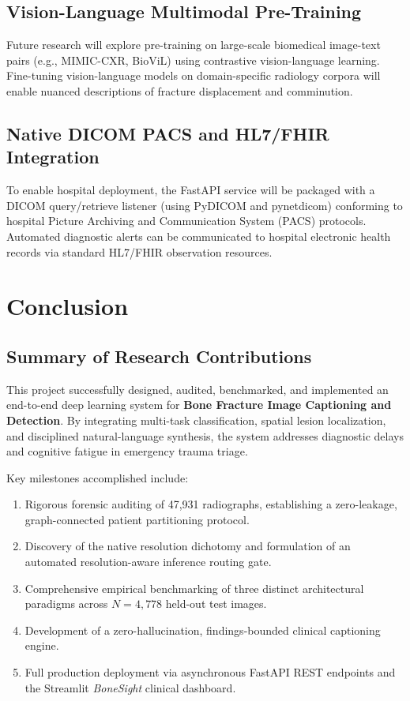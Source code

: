 \documentclass[12pt, a4paper]{report}
\begin{document}
\section{Vision-Language Multimodal Pre-Training}
Future research will explore pre-training on large-scale biomedical image-text pairs (e.g., MIMIC-CXR, BioViL) using contrastive vision-language learning. Fine-tuning vision-language models on domain-specific radiology corpora will enable nuanced descriptions of fracture displacement and comminution.

\section{Native DICOM PACS and HL7/FHIR Integration}
To enable hospital deployment, the FastAPI service will be packaged with a DICOM query/retrieve listener (using PyDICOM and pynetdicom) conforming to hospital Picture Archiving and Communication System (PACS) protocols. Automated diagnostic alerts can be communicated to hospital electronic health records via standard HL7/FHIR observation resources.

\newpage
\chapter{Conclusion}

\section{Summary of Research Contributions}
This project successfully designed, audited, benchmarked, and implemented an end-to-end deep learning system for \textbf{Bone Fracture Image Captioning and Detection}. By integrating multi-task classification, spatial lesion localization, and disciplined natural-language synthesis, the system addresses diagnostic delays and cognitive fatigue in emergency trauma triage.

Key milestones accomplished include:
\begin{enumerate}
    \item Rigorous forensic auditing of 47,931 radiographs, establishing a zero-leakage, graph-connected patient partitioning protocol.
    \item Discovery of the native resolution dichotomy and formulation of an automated resolution-aware inference routing gate.
    \item Comprehensive empirical benchmarking of three distinct architectural paradigms across $N=4,778$ held-out test images.
    \item Development of a zero-hallucination, findings-bounded clinical captioning engine.
    \item Full production deployment via asynchronous FastAPI REST endpoints and the Streamlit \textit{BoneSight} clinical dashboard.
\end{enumerate}
\end{document}
